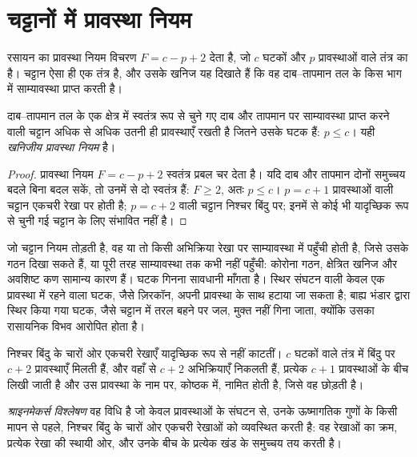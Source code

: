 \section{चट्टानों में प्रावस्था नियम}\label{sec:b3:petrological-thermodynamics:phase-rule}

रसायन का प्रावस्था नियम विचरण $F = c - p + 2$ देता है, जो
$c$ घटकों और $p$ प्रावस्थाओं वाले तंत्र का है। चट्टान ऐसा ही एक तंत्र है, और
उसके खनिज यह दिखाते हैं कि वह दाब--तापमान तल के किस भाग में साम्यावस्था प्राप्त करती है।

\begin{proposition}[खनिजीय प्रावस्था नियम]\label{prop:b3:petrological-thermodynamics:goldschmidt}
दाब--तापमान तल के एक क्षेत्र में स्वतंत्र रूप से चुने गए दाब और तापमान पर
साम्यावस्था प्राप्त करने वाली चट्टान अधिक से अधिक उतनी ही प्रावस्थाएँ रखती है
जितने उसके घटक हैं: $p \le c$। यही
\emph{खनिजीय प्रावस्था नियम} है।
\end{proposition}

\begin{proof}
प्रावस्था नियम $F = c - p + 2$ स्वतंत्र प्रबल चर देता है। यदि
दाब और तापमान दोनों समुच्चय बदले बिना बदल सकें, तो उनमें से
दो स्वतंत्र हैं: $F \ge 2$, अतः $p \le c$। $p = c + 1$ प्रावस्थाओं वाली चट्टान
एकचरी रेखा पर होती है; $p = c + 2$ वाली चट्टान निश्चर बिंदु पर; इनमें से
कोई भी यादृच्छिक रूप से चुनी गई चट्टान के लिए संभावित नहीं है।
\end{proof}

जो चट्टान नियम तोड़ती है, वह या तो किसी अभिक्रिया रेखा पर साम्यावस्था में पहुँची होती है, जिसे
उसके गठन दिखा सकते हैं, या पूरी तरह साम्यावस्था तक कभी नहीं पहुँची: कोरोना गठन,
क्षेत्रित खनिज और अवशिष्ट कण सामान्य कारण हैं। घटक गिनना
सावधानी माँगता है। स्थिर संघटन वाली केवल एक प्रावस्था में रहने वाला घटक, जैसे
ज़िरकॉन, अपनी प्रावस्था के साथ हटाया जा सकता है; बाह्य भंडार द्वारा स्थिर किया गया घटक,
जैसे चट्टान में तरल बहने पर जल, मुक्त नहीं गिना जाता,
क्योंकि उसका रासायनिक विभव आरोपित होता है।

निश्चर बिंदु के चारों ओर एकचरी रेखाएँ यादृच्छिक रूप से नहीं काटतीं। $c$ घटकों वाले
तंत्र में बिंदु पर $c + 2$ प्रावस्थाएँ मिलती हैं, और वहाँ से $c + 2$ अभिक्रियाएँ
निकलती हैं, प्रत्येक $c + 1$ प्रावस्थाओं के बीच लिखी जाती है और
उस प्रावस्था के नाम पर, कोष्ठक में, नामित होती है, जिसे वह छोड़ती है।

\begin{definition}[श्राइनमेकर्स विश्लेषण]\label{def:b3:petrological-thermodynamics:schreinemakers}
\emph{श्राइनमेकर्स विश्लेषण} वह विधि है
जो केवल प्रावस्थाओं के संघटन से, उनके ऊष्मागतिक गुणों के किसी मापन से पहले,
निश्चर बिंदु के चारों ओर एकचरी रेखाओं को व्यवस्थित करती है: वह
रेखाओं का क्रम, प्रत्येक रेखा की स्थायी ओर, और
उनके बीच के प्रत्येक खंड के समुच्चय तय करती है।
\end{definition}

